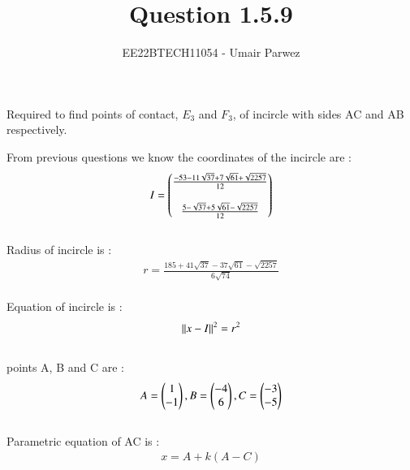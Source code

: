 \documentclass[journal,12pt,twocolumn]{IEEEtran}
\theoremstyle{remark}
\begin{document}



\vspace{3cm}

\title{
	Question 1.5.9
}

\author{
	EE22BTECH11054 - Umair Parwez
}	

\maketitle
\newpage
\bigskip

\renewcommand{\thefigure}{\theenumi}
\renewcommand{\thetable}{\theenumi}

\begin{flushleft}
	Required to find points of contact, $E_{3}$ and $F_{3}$, of incircle with sides AC and AB respectively.\\

	\bigskip

	From previous questions we know the coordinates of the incircle are : 
	\begin{align}
		I = 
		\begin{pmatrix}
			\frac{-53-11\sqrt{37}+7\sqrt{61}+\sqrt{2257}}{12} \\ \\
			\frac{5-\sqrt{37}+5\sqrt{61}-\sqrt{2257}}{12}
		\end{pmatrix}
	\end{align}\\

	Radius of incircle is :
    \begin{align}
		r = \frac{185+41\sqrt{37}-37\sqrt{61}-\sqrt{2257}}{6\sqrt{74}}
    \end{align}\\

	Equation of incircle is : 
	\begin{align}
		{\left\lVert x-I \right\rVert}^2 = {r}^2 
	\end{align}\\

	points A, B and C are : 
	\begin{align}
		A = \begin{pmatrix}
			1\\
			-1
		\end{pmatrix}, 
		B = \begin{pmatrix}
			-4\\
			6
		\end{pmatrix}, 
		C = \begin{pmatrix}
			-3\\
			-5
		\end{pmatrix}
	\end{align}\\

	Parametric equation of AC is :
	\begin{align}
		x = A + k(A-C)
	\end{align}\\
	

\end{flushleft}
\end{document}
